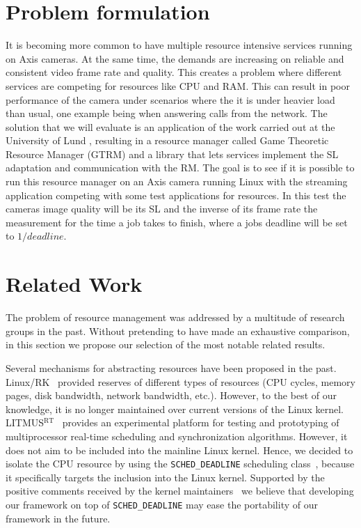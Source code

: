 \documentclass[nobiblatex]{LTHthesis}
\newcommand{\martina}[1]{\todo[inline,color=red!30,caption={}]{\textbf{Martina:} #1}}
\begin{document}
\section{Problem formulation}
It is becoming more common to have multiple resource intensive services running on Axis cameras. At the same time, the demands are increasing on reliable and consistent video frame rate and quality. This creates a problem where different services are competing for resources like CPU and RAM. This can result in poor performance of the camera under scenarios where the it is under heavier load than usual, one example being when answering calls from the network. The solution that we will evaluate is an application of the work carried out at the University of Lund \cite{gtrm}, resulting in a resource manager called Game Theoretic Resource Manager (GTRM) and a library that lets services implement the SL adaptation and communication with the RM. The goal is to see if it is possible to run this resource manager on an Axis camera running Linux with the streaming application competing with some test applications for resources. In this test the cameras image quality will be its SL and the inverse of its frame rate the measurement for the time a job takes to finish, where a jobs deadline will be set to \(1/deadline\).



\section{Related Work}

\martina{Rephrase this}

The problem of resource management was addressed by a multitude
of research groups in the past. Without pretending to have made an
exhaustive comparison, in this section we propose our selection of the
most notable related results.

Several mechanisms for abstracting resources have been proposed in the
past. Linux/RK~\cite{Oik99} provided reserves of different types of
resources (CPU cycles, memory pages, disk bandwidth, network
bandwidth, etc.). However, to the best of our knowledge, it is no longer
maintained over current versions of the Linux kernel.
LITMUS$^\mathrm{RT}$~\cite{Bra07} provides an experimental platform
for testing and prototyping of multiprocessor real-time scheduling and
synchronization algorithms. However, it does not aim to be included
into the mainline Linux kernel. Hence, we decided to isolate the CPU
resource by using the \texttt{SCHED\_DEADLINE} scheduling
class~\cite{Faggioli-SCHEDDEADLINE-2009}, because it specifically
targets the inclusion into the Linux kernel.  Supported by the
positive comments received by the kernel
maintainers~\cite{LinuxPeople} we believe that developing our
framework on top of \texttt{SCHED\_DEADLINE} may ease the portability
of our framework in the future.
\end{document}
